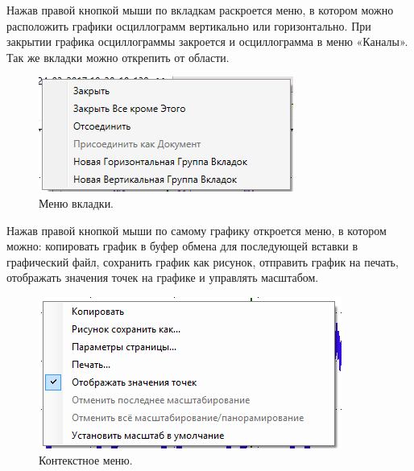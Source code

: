 \documentclass[a4paper,12pt]{article}
\begin{document}
 
Нажав правой кнопкой мыши по вкладкам раскроется меню, в котором можно расположить графики осциллограмм вертикально или горизонтально. При закрытии графика осциллограммы закроется и осциллограмма в меню «Каналы». Так же вкладки можно открепить от области. 
 
 
\begin{figure}[h] 
\centering 
\includegraphics[width=40ex]{image/Screenshot_4.png} 
\caption{Меню вкладки.} 
\end{figure} 
 
 
Нажав правой кнопкой мыши по самому графику откроется меню, в котором можно: копировать график в буфер обмена для последующей вставки в графический файл, сохранить график как рисунок, отправить график на печать, отображать значения точек на графике и управлять масштабом. 
 
 
\begin{figure}[h] 
\centering 
\includegraphics[width=40ex]{image/Screenshot_6.png} 
\caption{Контекстное меню.} 
\end{figure} 
 
 
 
 
 
 
 
 
 
 
\end{document}
